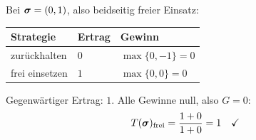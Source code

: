 \begin{aufgabe}
Bei $\boldsymbol{\sigma} = (0,1)$, also beidseitig freier Einsatz:
\begin{center}
\renewcommand{\arraystretch}{1.48}
\begin{tabular}{@{}P{2.8cm}P{1.8cm}P{2.4cm}@{}}
\toprule
\textbf{Strategie} & \textbf{Ertrag} & \textbf{Gewinn}\\
\midrule
zurückhalten & $0$ & $\max\{0,-1\} = 0$\\
frei einsetzen & $1$ & $\max\{0,0\} = 0$\\
\bottomrule
\end{tabular}
\end{center}

Gegenwärtiger Ertrag: $1$. Alle Gewinne null, also $G = 0$:
\[ T(\boldsymbol{\sigma})_{\text{frei}} = \frac{1+0}{1+0} = 1 \quad \checkmark \]

\begin{center}
\begin{minipage}{0.88\textwidth}
\end{minipage}
\end{center}
\end{aufgabe}

